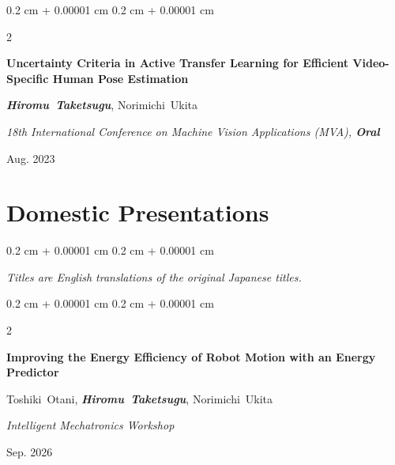 \documentclass[10pt, letterpaper]{article}
\newenvironment{onecolentry}{
    \begin{adjustwidth}{
        0.2 cm + 0.00001 cm
    }{
        0.2 cm + 0.00001 cm
    }
}{
    \end{adjustwidth}
} %
\newenvironment{twocolentry}[2][]{
    \onecolentry
    \def\secondColumn{#2}
    \setcolumnwidth{\fill, 4.5 cm}
    \begin{paracol}{2}
}{
    \switchcolumn \raggedleft \secondColumn
    \end{paracol}
    \endonecolentry
} %
\begin{document}
        \vspace{0.2 cm}

        \begin{samepage}
            \begin{twocolentry}{
                Aug. 2023
            }
                \textbf{Uncertainty Criteria in Active Transfer Learning for Efficient Video-Specific Human Pose Estimation}

                \vspace{0.10 cm}

                \mbox{\textbf{\textit{Hiromu Taketsugu}}}, \mbox{Norimichi Ukita}
                \vspace{0.10 cm}

                \textit{18th International Conference on Machine Vision Applications (MVA), \textbf{Oral}}
            \end{twocolentry}
        \end{samepage}

    \section{Domestic Presentations}
        \begin{onecolentry}
            \textit{Titles are English translations of the original Japanese titles.}
        \end{onecolentry}

        \vspace{0.2 cm}

        \begin{samepage}
            \begin{twocolentry}{
                Sep. 2026
            }
                \textbf{Improving the Energy Efficiency of Robot Motion with an Energy Predictor}

                \vspace{0.10 cm}

                \mbox{Toshiki Otani}, \mbox{\textbf{\textit{Hiromu Taketsugu}}}, \mbox{Norimichi Ukita}
                \vspace{0.10 cm}

                \textit{Intelligent Mechatronics Workshop}
            \end{twocolentry}
        \end{samepage}

        \vspace{0.2 cm}
\end{document}
